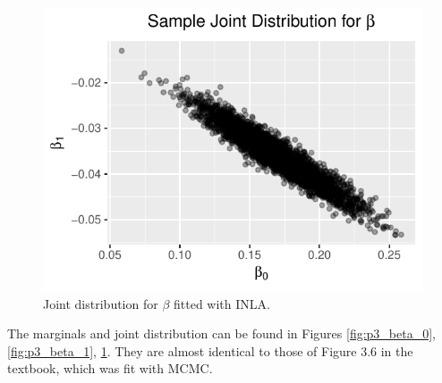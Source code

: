 \documentclass[letterpaper,11pt]{article}
\begin{document}
\begin{enumerate}
\begin{enumerate}
\begin{description}
      \begin{figure}
        \centering
        \includegraphics{p3_beta_joint.pdf}
        \caption{Joint distribution for $\beta$ fitted with INLA.}
        \label{fig:p3_beta_joint}
      \end{figure}

      The marginals and joint distribution can be found in Figures
      \ref{fig:p3_beta_0}, \ref{fig:p3_beta_1}, \ref{fig:p3_beta_joint}. They
      are almost identical to those of Figure 3.6 in the textbook, which was fit
      with MCMC.
      

\end{description}
\end{enumerate}
\end{enumerate}
\end{document}
